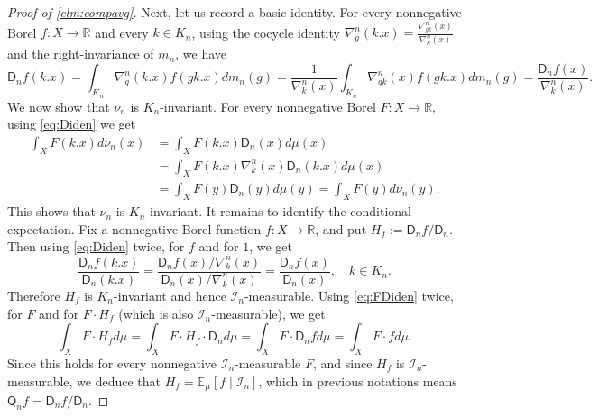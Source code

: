 \documentclass{amsart}
\numberwithin{equation}{subsection}
\theoremstyle{plain}
\theoremstyle{definition}
\theoremstyle{plain}
\begin{document}
\begin{proof}[Proof of \cref{clm:compavg}]
Next, let us record a basic identity. For every nonnegative Borel \(f:X\to\mathbb{R}\) and every \(k\in K_{n}\), using the cocycle identity \(\nabla_{g}^{n}\left(k.x\right)=\frac{\nabla_{gk}^{n}\left(x\right)}{\nabla_{k}^{n}\left(x\right)}\) and the right-invariance of \(m_{n}\), we have
\begin{equation}\label{eq:Diden}
\mathsf{D}_{n}f\left(k.x\right)=\int_{K_{n}}\nabla_{g}^{n}\left(k.x\right)f\left(gk.x\right)dm_{n}\left(g\right)=\frac{1}{\nabla_{k}^{n}\left(x\right)}\int_{K_{n}}\nabla_{gk}^{n}\left(x\right)f\left(gk.x\right)dm_{n}\left(g\right)=\frac{\mathsf{D}_{n}f\left(x\right)}{\nabla_{k}^{n}\left(x\right)}.
\end{equation}
We now show that \(\nu_{n}\) is \(K_{n}\)-invariant. For every nonnegative Borel \(F:X\to\mathbb{R}\), using \eqref{eq:Diden} we get
\begin{align*}
\int_{X}F\left(k.x\right)d\nu_{n}\left(x\right)
&=\int_{X}F\left(k.x\right)\mathsf{D}_{n}\left(x\right)d\mu\left(x\right)\\
&=\int_{X}F\left(k.x\right)\nabla_{k}^{n}\left(x\right)\mathsf{D}_{n}\left(k.x\right)d\mu\left(x\right)\\
&=\int_{X}F\left(y\right)\mathsf{D}_{n}\left(y\right)d\mu\left(y\right)=\int_{X}F\left(y\right)d\nu_{n}\left(y\right).
\end{align*}
This shows that \(\nu_{n}\) is \(K_{n}\)-invariant. It remains to identify the conditional expectation. Fix a nonnegative Borel function \(f:X\to\mathbb{R}\), and put \(H_{f}:=\mathsf{D}_{n}f/\mathsf{D}_{n}\). Then using \eqref{eq:Diden} twice, for \(f\) and for \(1\), we get
\[\frac{\mathsf{D}_{n}f\left(k.x\right)}{\mathsf{D}_{n}\left(k.x\right)}=\frac{\mathsf{D}_{n}f\left(x\right)/\nabla_{k}^{n}\left(x\right)}{\mathsf{D}_{n}\left(x\right)/\nabla_{k}^{n}\left(x\right)}=\frac{\mathsf{D}_{n}f\left(x\right)}{\mathsf{D}_{n}\left(x\right)},\quad k\in K_{n}.\]
Therefore \(H_{f}\) is \(K_{n}\)-invariant and hence \(\mathcal{I}_{n}\)-measurable. Using \eqref{eq:FDiden} twice, for \(F\) and for \(F\cdot H_{f}\) (which is also \(\mathcal{I}_{n}\)-measurable), we get
\[\int_{X}F\cdot H_{f}d\mu=\int_{X}F\cdot H_{f}\cdot\mathsf{D}_{n}d\mu=\int_{X}F\cdot\mathsf{D}_{n}fd\mu=\int_{X}F\cdot fd\mu.\]
Since this holds for every nonnegative \(\mathcal{I}_{n}\)-measurable \(F\), and since \(H_{f}\) is \(\mathcal{I}_{n}\)-measurable, we deduce that \(H_{f}=\mathbb{E}_{\mu}\left[f\mid\mathcal{I}_{n}\right]\), which in previous notations means \(\mathsf{Q}_{n}f=\mathsf{D}_{n}f/\mathsf{D}_{n}\).
\end{proof}
\end{document}
